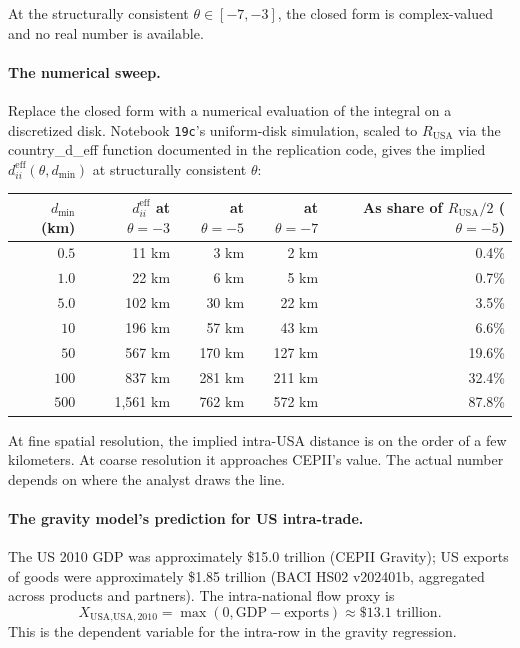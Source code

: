 \documentclass[11pt, letterpaper]{article}
\theoremstyle{definition}
\newcommand{\eff}{\mathrm{eff}}
\newcommand{\dii}{d_{ii}}
\begin{document}
At the structurally consistent $\theta \in [-7, -3]$, the closed form
is complex-valued and no real number is available.

\paragraph{The numerical sweep.}
Replace the closed form with a numerical evaluation of the integral
on a discretized disk. Notebook \texttt{19c}'s uniform-disk simulation,
scaled to $R_{\text{USA}}$ via the country\_d\_eff function
documented in the replication code, gives the implied
$\dii^{\eff}(\theta, d_{\min})$ at structurally consistent $\theta$:

\begin{center}
\begin{tabular}{r r r r r}
\toprule
$d_{\min}$ (km) & $\dii^{\eff}$ at $\theta = -3$ & at $\theta = -5$ & at $\theta = -7$ & As share of $R_{\text{USA}}/2$ ($\theta = -5$) \\
\midrule
$0.5$ & 11 km & 3 km & 2 km & 0.4\% \\
$1.0$ & 22 km & 6 km & 5 km & 0.7\% \\
$5.0$ & 102 km & 30 km & 22 km & 3.5\% \\
$10$ & 196 km & 57 km & 43 km & 6.6\% \\
$50$ & 567 km & 170 km & 127 km & 19.6\% \\
$100$ & 837 km & 281 km & 211 km & 32.4\% \\
$500$ & 1{,}561 km & 762 km & 572 km & 87.8\% \\
\bottomrule
\end{tabular}
\end{center}

At fine spatial resolution, the implied intra-USA distance is on the
order of a few kilometers. At coarse resolution it approaches
CEPII's value. The actual number depends on where the analyst draws
the line.

\paragraph{The gravity model's prediction for US intra-trade.}
The US 2010 GDP was approximately \$15.0 trillion (CEPII Gravity);
US exports of goods were approximately \$1.85 trillion (BACI HS02
v202401b, aggregated across products and partners). The
\citet{wei_1996_intranational} intra-national flow proxy is
\[
X_{\text{USA,USA},2010} = \max(0, \text{GDP} - \text{exports}) \approx \$13.1 \text{ trillion}.
\]
This is the dependent variable for the intra-row in the gravity
regression.
\end{document}

